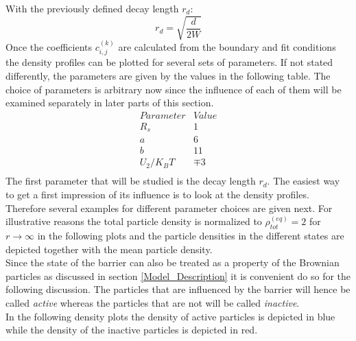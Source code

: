 With the previously defined decay length $r_d$:
\begin{equation}
    r_d = \sqrt{\frac{d}{2W}}
    \label{rd_two_state}
\end{equation}
Once the coefficients $c^{(k)}_{i,j}$ are calculated from the boundary and fit conditions the density profiles can be plotted for several sets of parameters. If not stated differently, the parameters are given by the values in the following table. The choice of parameters is arbitrary now since the influence of each of them will be examined separately in later parts of this section.
\begin{equation}
    \begin{array}{r|l}
        Parameter & Value \\ \hline
        R_s & 1 \\
        a   & 6 \\
        b   & 11 \\
        U_2/K_B T & \mp 3 \\
    \end{array} \nonumber
    \label{Parameters}
\end{equation}
The first parameter that will be studied is the decay length $r_d$. The easiest way to get a first impression of its influence is to look at the density profiles. Therefore several examples for different parameter choices are given next.
For illustrative reasons the total particle density is normalized to $\rho_{tot}^{(eq)}=2$ for $r \rightarrow \infty$ in the following plots and the particle densities in the different states are depicted together with the mean particle density. \\
Since the state of the barrier can also be treated as a property of the Brownian particles as discussed in section \ref{Model_Description} it is convenient do so for the following discussion. The particles that are influenced by the barrier will hence be called \emph{active} whereas the particles that are not will be called \emph{inactive}. \\ In the following density plots the density of active particles is depicted in blue while the density of the inactive particles is depicted in red.


